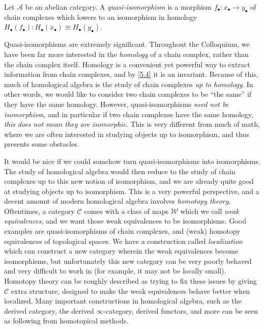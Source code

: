 \begin{definition}\label{5.8}
	Let $\mathcal{A} $ be an abelian category. A \emph{quasi-isomorphism} is a morphism $f_{\bullet} : x_{\bullet}  \to y_{\bullet} $ of chain complexes which lowers to an isomorphism in homology $H_{\bullet} (f_{\bullet} ): H_{\bullet} (x_{\bullet} )\cong H_{\bullet} (y_{\bullet} )$.
\end{definition}

Quasi-isomorphisms are extremely significant. Throughout the Colloquium, we have been far more interested in the \emph{homology} of a chain complex, rather than the chain complex itself. Homology is a convenient yet powerful way to extract information from chain complexes, and by \cref{5.4} it is an invariant. Because of this, much of homological algebra is the study of chain complexes \emph{up to homology}. In other words, we would like to consider two chain complexes to be ``the same'' if they have the same homology. However, quasi-isomorphisms \emph{need not be isomorphism}, and in particular if two chain complexes have the same homology, \emph{this does not mean they are isomorphic}. This is very different from much of math, where we are often interested in studying objects up to isomorphism, and thus presents some obstacles.

\begin{digression}\label{5.9}
	It would be nice if we could somehow turn quasi-isomorphisms into isomorphisms. The study of homological algebra would then reduce to the study of chain complexes up to this new notion of isomorphism, and we are already quite good at studying objects up to isomorphism. This is a very powerful perspective, and a decent amount of modern homological algebra involves \emph{homotopy theory}. Oftentimes, a category $\mathcal{C} $ comes with a class of maps $\mathcal{W} $ which we call \emph{weak equivalences}, and we want those weak equivalences to be isomorphisms. Good examples are quasi-isomorphisms of chain complexes, and (weak) homotopy equivalences of topological spaces. We have a construction called \emph{localization} which can construct a new category wherein the weak equivalences become isomorphisms, but unfortunately this new category can be very poorly behaved and very difficult to work in (for example, it may not be locally small). Homotopy theory can be roughly described as trying to fix these issues by giving $\mathcal{C} $ extra structure, designed to make the weak equivalences behave better when localized. Many important constructions in homological algebra, such as the derived category, the derived $\infty $-category, derived functors, and more can be seen as following from homotopical methods.
\end{digression}


